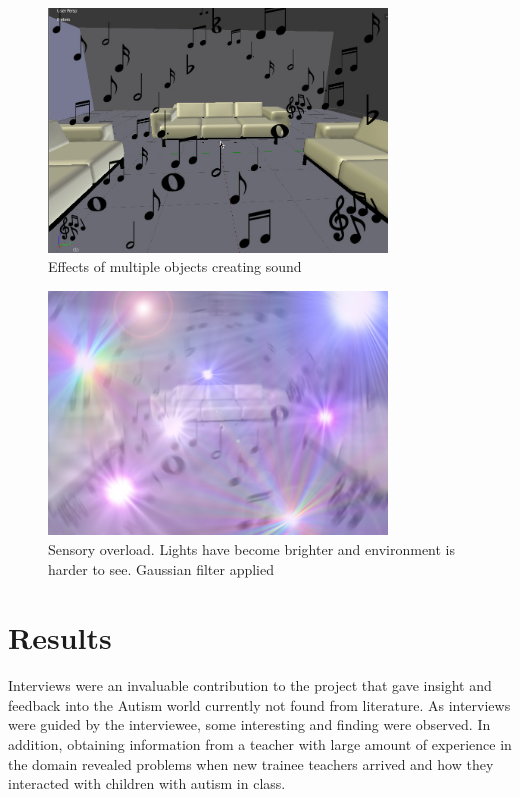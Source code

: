 \documentclass[11pt]{report}
\begin{document}
\begin{figure}[H]
\centering
\includegraphics[width=90mm]{images/design/GD_moresound.jpg}
\caption{Effects of multiple objects creating sound}
\label{sensorymockup2}
\end{figure}

\begin{figure}[H]
\centering
\includegraphics[width=90mm]{images/design/GD_overload.jpg}
\caption{Sensory overload. Lights have become brighter and environment is harder to see. Gaussian filter applied}
\label{sensorymockup3}
\end{figure}

\section{Results}
Interviews were an invaluable contribution to the project that gave insight and feedback into the Autism world currently not found from literature. As interviews were guided by the interviewee, some interesting and finding were observed. In addition, obtaining information from a teacher with large amount of experience in the domain revealed problems when new trainee teachers arrived and how they interacted with children with autism in class.  
\end{document}
